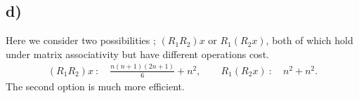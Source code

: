 \documentclass[12pt]{article}
\theoremstyle{definition}
\theoremstyle{definition}
\theoremstyle{definition}
\theoremstyle{definition}
\theoremstyle{definition}
\theoremstyle{example}
\theoremstyle{note}
\theoremstyle{remark}
\theoremstyle{example}
\begin{document}
			\subsection*{d) }
				Here we consider two possibilities ; $(R_{1}R_{2})x$ or $R_{1}(R_{2}x)$, both of which hold under matrix associativity but have different operations cost. 
				\begin{align*}
					(R_{1}R_{2})x  \ : \quad \frac{n(n+1)(2n+1)}{6} + n^2 ,\qquad R_{1}(R_{2}x)  \ : \quad n^{2} + n^{2}.
				\end{align*}
				The second option is much more efficient. 
				
\end{document}
